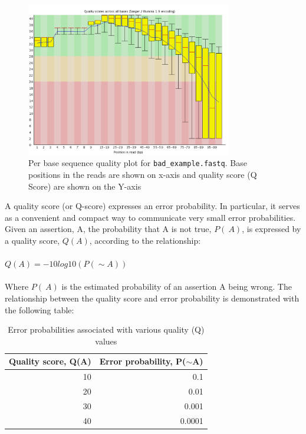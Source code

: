 \begin{figure}[H]
\centering
\includegraphics[width=0.8\textwidth]{ngs-qc/bad_example.png}
\caption{Per base sequence quality plot for \texttt{bad\_example.fastq}. Base positions in the reads are shown on x-axis and quality score (Q Score) are shown on the Y-axis}
\label{fig:bad_example_plot}
\end{figure}

\begin{information}
A quality score (or Q-score) expresses an error probability.  In particular, it
serves as a convenient and compact way to communicate very small error
probabilities.
Given an assertion, A, the probability that A is not true, $P(~ A)$, is expressed
by a quality score, $Q(A)$, according to the relationship:
\\\\
$Q(A) =-10 log10(P(\sim A))$
\\\\
Where $P(~ A)$ is the estimated probability of an assertion A being wrong.
The relationship between the quality score and error probability is demonstrated
with the following table:

\begin{table}[H]
  \centering
  \caption{Error probabilities associated with various quality (Q) values}
    \begin{tabular}{rr}
    \toprule
    \textbf{Quality score, Q(A)} & \textbf{Error probability, P($\sim$A)} \\
    \midrule
    10    & 0.1 \\
    20    & 0.01 \\
    30    & 0.001 \\
    40    & 0.0001 \\
    \bottomrule
    \end{tabular}%
  \label{tab:addlabel}%
\end{table}%

\end{information}

